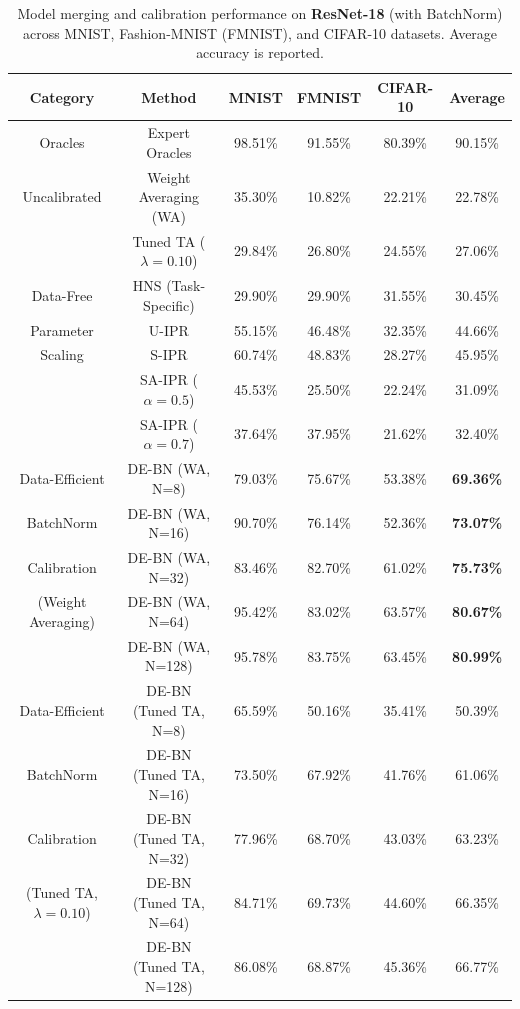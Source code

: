 \documentclass{article}
\begin{document}
\begin{table}[t]
\caption{Model merging and calibration performance on \textbf{ResNet-18} (with BatchNorm) across MNIST, Fashion-MNIST (FMNIST), and CIFAR-10 datasets. Average accuracy is reported.}
\label{tab:resnet_results}
\begin{center}
\begin{small}
\begin{tabular}{cccccc}
\toprule
Category & Method & MNIST & FMNIST & CIFAR-10 & Average \\
\midrule
Oracles & Expert Oracles & 98.51\% & 91.55\% & 80.39\% & 90.15\% \\
\midrule
Uncalibrated & Weight Averaging (WA) & 35.30\% & 10.82\% & 22.21\% & 22.78\% \\
 & Tuned TA ($\lambda = 0.10$) & 29.84\% & 26.80\% & 24.55\% & 27.06\% \\
\midrule
Data-Free & HNS (Task-Specific) & 29.90\% & 29.90\% & 31.55\% & 30.45\% \\
Parameter & U-IPR & 55.15\% & 46.48\% & 32.35\% & 44.66\% \\
Scaling & S-IPR & 60.74\% & 48.83\% & 28.27\% & 45.95\% \\
 & SA-IPR ($\alpha = 0.5$) & 45.53\% & 25.50\% & 22.24\% & 31.09\% \\
 & SA-IPR ($\alpha = 0.7$) & 37.64\% & 37.95\% & 21.62\% & 32.40\% \\
\midrule
Data-Efficient & DE-BN (WA, N=8) & 79.03\% & 75.67\% & 53.38\% & \textbf{69.36\%} \\
BatchNorm & DE-BN (WA, N=16) & 90.70\% & 76.14\% & 52.36\% & \textbf{73.07\%} \\
Calibration & DE-BN (WA, N=32) & 83.46\% & 82.70\% & 61.02\% & \textbf{75.73\%} \\
(Weight Averaging) & DE-BN (WA, N=64) & 95.42\% & 83.02\% & 63.57\% & \textbf{80.67\%} \\
 & DE-BN (WA, N=128) & 95.78\% & 83.75\% & 63.45\% & \textbf{80.99\%} \\
\midrule
Data-Efficient & DE-BN (Tuned TA, N=8) & 65.59\% & 50.16\% & 35.41\% & 50.39\% \\
BatchNorm & DE-BN (Tuned TA, N=16) & 73.50\% & 67.92\% & 41.76\% & 61.06\% \\
Calibration & DE-BN (Tuned TA, N=32) & 77.96\% & 68.70\% & 43.03\% & 63.23\% \\
(Tuned TA, $\lambda=0.10$) & DE-BN (Tuned TA, N=64) & 84.71\% & 69.73\% & 44.60\% & 66.35\% \\
 & DE-BN (Tuned TA, N=128) & 86.08\% & 68.87\% & 45.36\% & 66.77\% \\
\bottomrule
\end{tabular}
\end{small}
\end{center}
\end{table}
\end{document}
